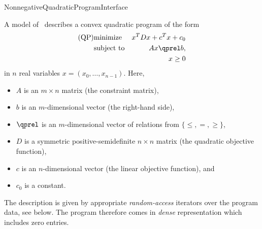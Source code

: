\begin{ccRefConcept}{NonnegativeQuadraticProgramInterface}

\ccDefinition
A model of \ccRefName\ describes a convex quadratic program of the form
\begin{eqnarray*}
\mbox{(QP)}& \mbox{minimize} & x^{T}Dx+c^{T}x+c_0 \\
&\mbox{subject to}   & Ax\qprel b, \\
&                    & x\geq 0
\end{eqnarray*}
in $n$ real variables $x=(x_0,\ldots,x_{n-1})$.
Here, 
\begin{itemize}
\item $A$ is an $m\times n$ matrix (the constraint matrix), 
\item $b$ is an $m$-dimensional vector (the right-hand side),
\item $\qprel$ is an $m$-dimensional vector of relations 
from $\{\leq, =, \geq\}$, 
\item $D$ is a symmetric positive-semidefinite $n\times n$ matrix (the
  quadratic objective function),
\item $c$ is an $n$-dimensional vector (the linear objective
  function), and 
\item $c_0$ is a constant.
\end{itemize}

The description is given by appropriate \emph{random-access} 
iterators over the program data, see below. The program therefore 
comes in \emph{dense} representation which includes zero entries.

\ccHasModels
{}\\
\\
\\

\ccTypes





\end{ccRefConcept}
